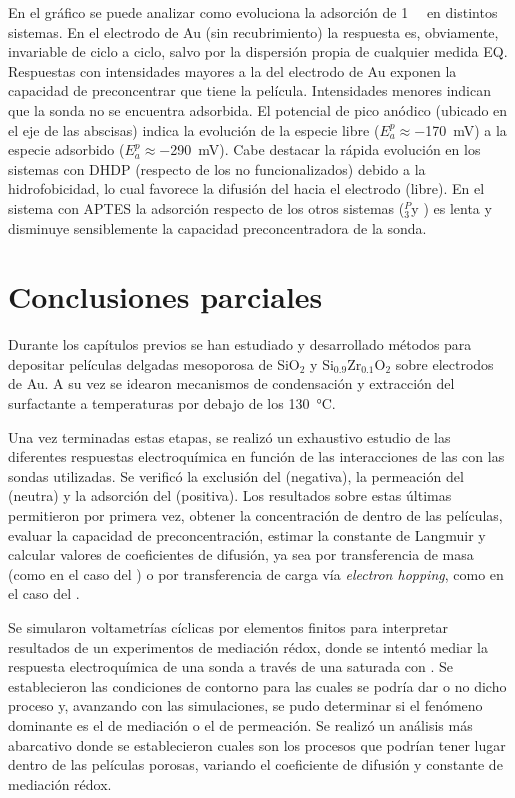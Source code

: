 	 	 En el gráfico se puede analizar como evoluciona la adsorción de \ru\space \SI{1}{\milli\Molar} en distintos sistemas. En el electrodo de Au (sin recubrimiento) la respuesta es, obviamente, invariable de ciclo a ciclo, salvo por la dispersión propia de cualquier medida EQ. Respuestas con intensidades mayores a la del electrodo de Au exponen la capacidad de preconcentrar que tiene la película. Intensidades menores indican que la sonda no se encuentra adsorbida. El potencial de pico anódico (ubicado en el eje de las abscisas) indica la evolución de la especie \ru\space libre ($E^p_{a}\approx$\SI{-170}{\milli\volt}) a la especie \ru\space adsorbido ($E^p_{a}\approx$\SI{-290}{\milli\volt}). Cabe destacar la rápida evolución en los sistemas con DHDP (respecto de los no funcionalizados) debido a la hidrofobicidad, lo cual favorece la difusión del \ru\space hacia el electrodo (\ru\space libre). En el sistema con APTES la adsorción respecto de los otros sistemas (\pdmZ$^P_3$\space y \pdmZ) es lenta y disminuye sensiblemente la capacidad preconcentradora de la sonda.

\section{Conclusiones parciales}
	
	Durante los capítulos previos se han estudiado y desarrollado métodos para depositar películas delgadas mesoporosa de SiO$_2$ y Si$_{0.9}$Zr$_{0.1}$O$_2$  sobre electrodos de Au. A su vez se idearon mecanismos de condensación y extracción del surfactante a temperaturas por debajo de los \SI{130}{\celsius}. 

	Una vez terminadas estas etapas, se realizó un exhaustivo estudio de las diferentes respuestas electroquímica en función de las interacciones de las \pdm\space con las sondas utilizadas. Se verificó la exclusión del \ferroferri\space (negativa), la permeación del \fc\space (neutra) y la adsorción del \aminorutenio\space (positiva). Los resultados sobre estas últimas permitieron por primera vez, obtener la concentración de \ru\space dentro de las películas, evaluar la capacidad de preconcentración, estimar la constante de Langmuir y calcular valores de coeficientes de difusión, ya sea por transferencia de masa (como en el caso del \fc) o por transferencia de carga vía \textit{electron hopping}, como en el caso del \ru.

	Se simularon voltametrías cíclicas por elementos finitos para interpretar resultados de un experimentos de mediación rédox, donde se intentó mediar la respuesta electroquímica de una sonda a través de una \pdm\space saturada con \ru. Se establecieron las condiciones de contorno para las cuales se podría dar o no dicho proceso y, avanzando con las simulaciones, se pudo determinar si el fenómeno dominante es el de mediación o el de permeación. Se realizó un análisis más abarcativo donde se establecieron cuales son los procesos que podrían tener lugar dentro de las películas porosas, variando el coeficiente de difusión y constante de mediación rédox.

